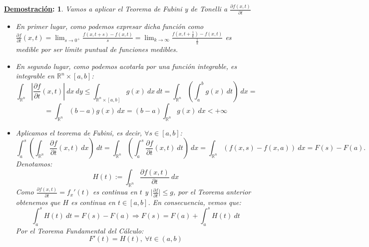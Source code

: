 \documentclass[10pt,a4paper,openright]{book}
\theoremstyle{break}
\newtheorem*{demo}{\underline{Demostración}:}
\newcommand{\dif}[1]{\ d#1}
\begin{document}
\begin{demo}
Vamos a aplicar el Teorema de Fubini y de Tonelli a $\frac{\partial f\left(x, t\right)}{\partial t} $
\begin{itemize}
    \item En primer lugar, como podemos expresar dicha función como $\frac{\partial f}{\partial t} \left(x, t\right) = \lim_{s \rightarrow 0^+} \frac{f \left(x, t + s\right) - f \left(x, t\right)}{s} = \lim_{k \rightarrow \infty} \frac{f \left(x, t + \frac{1}{k}\right) - f \left(x, t\right)}{\frac{1}{k}}$ es medible por ser límite puntual de funciones medibles.
    \item En segundo lugar, como podemos acotarla por una función integrable, es integrable en $\mathbb{R}^n \times \left[a, b\right]$:
    $$\int_{\mathbb{R}^n} \left\vert \frac{\partial f}{\partial t} \left(x, t\right)\right\vert  \dif{x} \dif{y} \le \int_{\mathbb{R}^n \times \left[a, b\right]} g \left(x\right) \dif{x} \dif{t} = \int_{\mathbb{R}^n} \left(\int_a^b g \left(x\right) \dif{t}  \right) \dif{x}  = $$
    $$ = \int_{\mathbb{R}^n} \left(b - a\right) g \left(x\right) \dif{x} = \left(b - a\right) \int_{\mathbb{R}^n} g(x) \dif{x}< +\infty$$
    \item Aplicamos el teorema de Fubini, es decir, $\forall s \in \left[a, b\right]$: 
    $$\int_a^s \left(\int_{\mathbb{R}^n} \frac{\partial f}{\partial t} \left(x, t\right) \dif{x} \right) \dif{t} = \int_{\mathbb{R}^n} \left(\int_a^s \frac{\partial f}{\partial t} \left(x, t\right) \dif{t} \right) \dif{x} = \int_{\mathbb{R}^n} \left( f \left(x, s\right) - f \left(x, a\right)\right) \dif{x} = F \left(s\right) - F \left(a\right).$$
    Denotamos: 
    $$H \left(t\right) := \int_{\mathbb{R}^n} \frac{\partial f\left(x, t\right)}{\partial t}  \dif{x}$$
    Como $\frac{\partial f\left(x, t\right)}{\partial t}  = f_x' \left(t\right)$ es continua en $t$ y $\vert \frac{\partial f}{\partial t} \vert \le g$, por el Teorema anterior obtenemos que $H$ es continua en $t \in \left[a, b\right]$. En consecuencia, vemos que: 
    $$\int_a^s H \left(t\right) \dif{t} = F \left(s\right) - F \left(a\right) \Rightarrow F \left(s\right) = F \left(a\right) + \int_a^s H \left(t\right) \dif{t}$$
	Por el Teorema Fundamental del Cálculo:    
    $$F' \left(t\right) = H \left(t\right),\ \forall t \in \left(a, b\right) $$
\end{itemize}
\end{demo}
\end{document}
